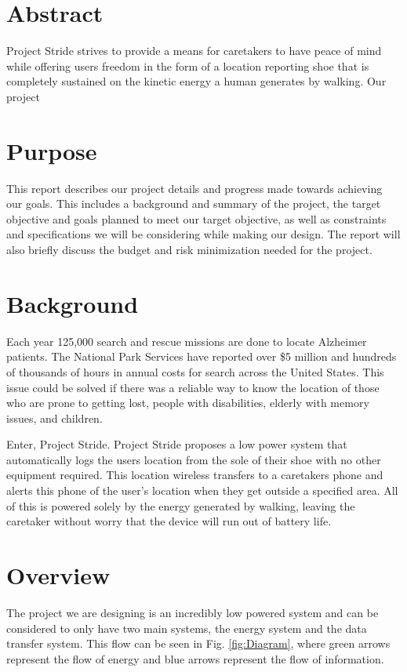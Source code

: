 \documentclass[letterpaper, 12 pt, onecolumn, hidelinks]{ieeetran}
\begin{document}
\section*{Abstract}
Project Stride strives to provide a means for caretakers to have peace of mind while offering users freedom in the form of a location reporting shoe that is completely sustained on the kinetic energy a human generates by walking. Our project

\break

\section{Purpose}\label{sec:Purpose}
This report describes our project details and progress made towards achieving our goals. This includes a background and summary of the project, the target objective and goals planned to meet our target objective, as well as constraints and specifications we will be considering while making our design. The report will also briefly discuss the budget and risk minimization needed for the project.

\section{Background}\label{sec:Background}
Each year 125,000 search and rescue missions are done to locate Alzheimer patients. The National Park Services have reported over \$5 million and hundreds of thousands of hours in annual costs for search across the United States. This issue could be solved if there was a reliable way to know the location of those who are prone to getting lost, people with disabilities, elderly with memory issues, and children. 

Enter, Project Stride. Project Stride proposes a low power system that automatically logs the users location from the sole of their shoe with no other equipment required. This location wireless transfers to a caretakers phone and alerts this phone of the user's location when they get outside a specified area. All of this is powered solely by the energy generated by walking, leaving the caretaker without worry that the device will run out of battery life.

\section{Overview}\label{sec:Overview}
The project we are designing is an incredibly low powered system and can be considered to only have two main systems, the energy system and the data transfer system. This flow can be seen in Fig. \ref{fig:Diagram}, where green arrows represent the flow of energy and blue arrows represent the flow of information.
\end{document}
